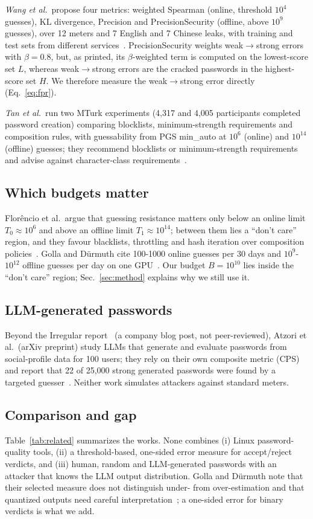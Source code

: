 \documentclass[conference]{IEEEtran}
\begin{document}
\emph{Wang et al.}\ propose four metrics: weighted Spearman (online, threshold $10^4$ guesses), KL divergence, Precision and PrecisionSecurity (offline, above $10^9$ guesses), over 12 meters and 7 English and 7 Chinese leaks, with training and test sets from different services~\cite{wang2023}. PrecisionSecurity weights weak$\to$strong errors with $\beta=0.8$, but, as printed, its $\beta$-weighted term is computed on the lowest-score set $L$, whereas weak$\to$strong errors are the cracked passwords in the highest-score set $H$. We therefore measure the weak$\to$strong error directly (Eq.~\ref{eq:fpr}).

\emph{Tan et al.}\ run two MTurk experiments (4{,}317 and 4{,}005 participants completed password creation) comparing blocklists, minimum-strength requirements and composition rules, with guessability from PGS min\_auto at $10^6$ (online) and $10^{14}$ (offline) guesses; they recommend blocklists or minimum-strength requirements and advise against character-class requirements~\cite{tan2020}.

\subsection{Which budgets matter}
Flor\^encio et al.\ argue that guessing resistance matters only below an online limit $T_0\approx10^6$ and above an offline limit $T_1\approx10^{14}$; between them lies a ``don't care'' region, and they favour blacklists, throttling and hash iteration over composition policies~\cite{florencio2016}. Golla and D\"urmuth cite 100-1000 online guesses per 30 days and $10^9$-$10^{12}$ offline guesses per day on one GPU~\cite{golla2018}. Our budget $B=10^{10}$ lies inside the ``don't care'' region; Sec.~\ref{sec:method} explains why we still use it.

\subsection{LLM-generated passwords}
Beyond the Irregular report~\cite{irregular2026} (a company blog post, not peer-reviewed), Atzori et al.\ (arXiv preprint) study LLMs that generate and evaluate passwords from social-profile data for 100 users; they rely on their own composite metric (CPS) and report that 22 of 25{,}000 strong generated passwords were found by a targeted guesser~\cite{atzori2025}. Neither work simulates attackers against standard meters.

\subsection{Comparison and gap}
Table~\ref{tab:related} summarizes the works. None combines (i) Linux password-quality tools, (ii) a threshold-based, one-sided error measure for accept/reject verdicts, and (iii) human, random and LLM-generated passwords with an attacker that knows the LLM output distribution. Golla and D\"urmuth note that their selected measure does not distinguish under- from over-estimation and that quantized outputs need careful interpretation~\cite{golla2018}; a one-sided error for binary verdicts is what we add.
\end{document}
